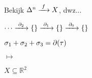 \documentclass[14pt]{beamer}
\begin{document}
\begin{frame}
	Bekijk $\Delta^n \xrightarrow{\,\,{f}\,\,} X$, dwz...

	\Large $\cdots \xrightarrow{\,\,{\partial_2}\,\,} \{\} \xrightarrow{\,\,{\partial_1}\,\,} \{\} \xrightarrow{\,\,{\partial_0}\,\,} \{\}$

	$ \sigma_1 + \sigma_2 + \sigma_3 = \partial(\tau) $

	$ \mapsto $

	$ X \subseteq \mathbb{R}^2 $
\end{frame}
\end{document}
